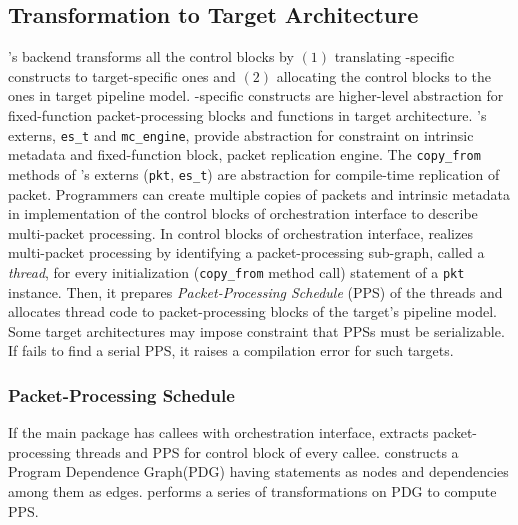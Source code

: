 \documentclass[letterpaper,twocolumn,10pt]{article}
\begin{document}
\subsection{Transformation to Target Architecture}
\ucomp's backend transforms all the control blocks by $(1)$ translating \uarch-specific constructs to target-specific ones and $(2)$ allocating the control blocks to the ones in target pipeline model.
\uarch-specific constructs are higher-level abstraction for fixed-function packet-processing blocks and functions in target architecture.
\uarch's externs, \texttt{es\_t} and \texttt{mc\_engine}, provide abstraction for constraint on intrinsic metadata and fixed-function block, packet replication engine.
The \texttt{copy\_from} methods of \uarch's externs (\texttt{pkt}, \texttt{es\_t}) are abstraction for compile-time replication of packet.
Programmers can create multiple copies of packets and intrinsic metadata in implementation of the control blocks of orchestration interface to describe multi-packet processing.
In control blocks of orchestration interface, \ucomp realizes multi-packet processing by identifying a packet-processing sub-graph, called a \emph{thread}, for every initialization (\texttt{copy\_from} method call) statement of a \texttt{pkt} instance.
Then, it prepares \emph{Packet-Processing Schedule} (PPS) of the threads and allocates thread code to packet-processing blocks of the target's pipeline model.
Some target architectures may impose constraint that PPSs must be serializable.
If \ucomp fails to find a serial PPS, it raises a compilation error for such targets. 



\subsubsection{Packet-Processing Schedule}
\label{subsubsection:packet-processing-schedule}
If the main package has callees with orchestration interface, \ucomp extracts packet-processing threads and PPS for control block of every callee.
\ucomp constructs a Program Dependence Graph(PDG) \cite{Ferrante:1987:PDG:24039.24041} having statements as nodes and dependencies among them as edges. 
\ucomp  performs a series of transformations on PDG to compute PPS.
\end{document}
